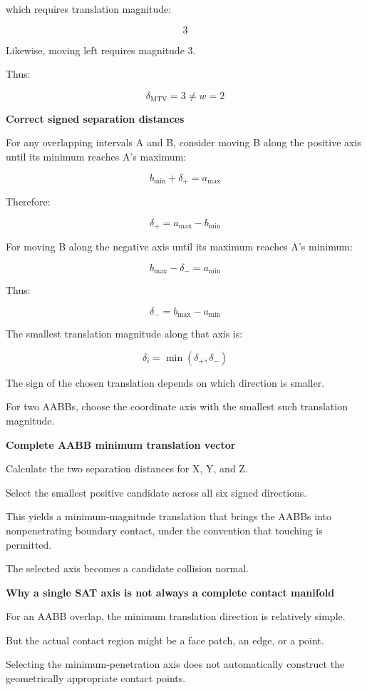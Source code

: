 which requires translation magnitude:

\[
3
\]

Likewise, moving left requires magnitude \(3\).

Thus:

\[
\boxed{\delta_{\mathrm{MTV}}=3\ne w=2}
\]

\textbf{Correct signed separation distances}

For any overlapping intervals A and B, consider moving B along the positive axis until its minimum reaches A's maximum:

\[
b_{\min}+\delta_+=a_{\max}
\]

Therefore:

\[
\boxed{ \delta_+=a_{\max}-b_{\min} }
\]

For moving B along the negative axis until its maximum reaches A's minimum:

\[
b_{\max}-\delta_-=a_{\min}
\]

Thus:

\[
\boxed{ \delta_-=b_{\max}-a_{\min} }
\]

The smallest translation magnitude along that axis is:

\[
\boxed{ \delta_i=\min(\delta_+,\delta_-) }
\]

The sign of the chosen translation depends on which direction is smaller.

For two AABBs, choose the coordinate axis with the smallest such translation magnitude.

\textbf{Complete AABB minimum translation vector}

Calculate the two separation distances for X, Y, and Z.

Select the smallest positive candidate across all six signed directions.

This yields a minimum-magnitude translation that brings the AABBs into nonpenetrating boundary contact, under the convention that touching is permitted.

The selected axis becomes a candidate collision normal.

\textbf{Why a single SAT axis is not always a complete contact manifold}

For an AABB overlap, the minimum translation direction is relatively simple.

But the actual contact region might be a face patch, an edge, or a point.

Selecting the minimum-penetration axis does not automatically construct the geometrically appropriate contact points.

